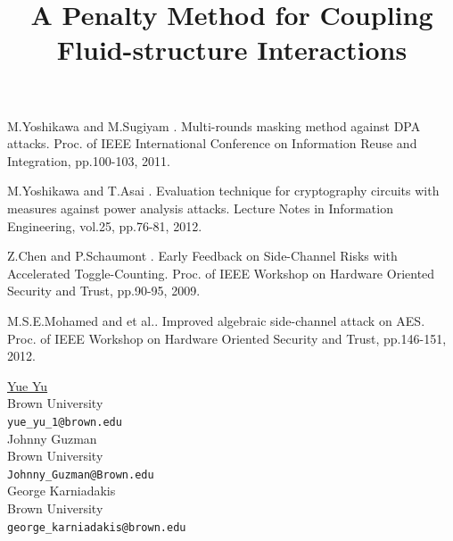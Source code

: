 \documentclass[article, A4, 11pt]{llncs}%
\begin{document}

\begin{thebibliography}{10}
{\sc M.Yoshikawa  and M.Sugiyam }. {Multi-rounds masking method against DPA attacks}. Proc. of IEEE International Conference on Information Reuse and Integration, pp.100-103, 2011.

{\sc M.Yoshikawa  and T.Asai }. {Evaluation technique for cryptography circuits with measures against power analysis attacks}. Lecture Notes in Information Engineering, vol.25, pp.76-81, 2012.

{\sc Z.Chen  and P.Schaumont }. {Early Feedback on Side-Channel Risks with Accelerated Toggle-Counting}. Proc. of IEEE Workshop on Hardware Oriented Security and Trust, pp.90-95, 2009.

{\sc M.S.E.Mohamed  and et al.}. {Improved algebraic side-channel attack on AES}. Proc. of IEEE Workshop on Hardware Oriented Security and Trust, pp.146-151, 2012.
\end{thebibliography} %

\title{A Penalty Method for Coupling Fluid-structure Interactions}
 \author{} \institute{}
\maketitle
\begin{center}
{\large \underline{Yue Yu}}\\
Brown University\\
{\tt yue\_yu\_1@brown.edu}
\\ \vspace{4mm}
{\large Johnny Guzman}\\
Brown University\\
{\tt Johnny\_Guzman@Brown.edu}
\\ \vspace{4mm}
{\large George Karniadakis}\\
Brown University\\
{\tt george\_karniadakis@brown.edu}
\end{center}
\end{document}
